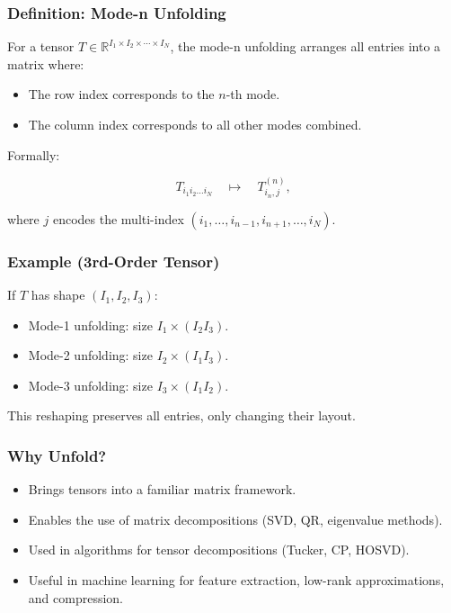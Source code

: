 \documentclass[
  letterpaper,
  DIV=11,
  numbers=noendperiod]{scrreprt}
\providecommand{\tightlist}{%
  \setlength{\itemsep}{0pt}\setlength{\parskip}{0pt}}
\begin{document}
\subsubsection{Definition: Mode-n
Unfolding}\label{definition-mode-n-unfolding}

For a tensor
\(T \in \mathbb{R}^{I_1 \times I_2 \times \cdots \times I_N}\), the
mode-n unfolding arranges all entries into a matrix where:

\begin{itemize}
\tightlist
\item
  The row index corresponds to the \(n\)-th mode.
\item
  The column index corresponds to all other modes combined.
\end{itemize}

Formally:

\[
T_{i_1 i_2 \dots i_N} \quad \mapsto \quad T^{(n)}_{i_n, j},
\]

where \(j\) encodes the multi-index
\((i_1,\dots,i_{n-1},i_{n+1},\dots,i_N)\).

\subsubsection{Example (3rd-Order
Tensor)}\label{example-3rd-order-tensor}

If \(T\) has shape \((I_1,I_2,I_3)\):

\begin{itemize}
\tightlist
\item
  Mode-1 unfolding: size \(I_1 \times (I_2 I_3)\).
\item
  Mode-2 unfolding: size \(I_2 \times (I_1 I_3)\).
\item
  Mode-3 unfolding: size \(I_3 \times (I_1 I_2)\).
\end{itemize}

This reshaping preserves all entries, only changing their layout.

\subsubsection{Why Unfold?}\label{why-unfold}

\begin{itemize}
\tightlist
\item
  Brings tensors into a familiar matrix framework.
\item
  Enables the use of matrix decompositions (SVD, QR, eigenvalue
  methods).
\item
  Used in algorithms for tensor decompositions (Tucker, CP, HOSVD).
\item
  Useful in machine learning for feature extraction, low-rank
  approximations, and compression.
\end{itemize}
\end{document}
